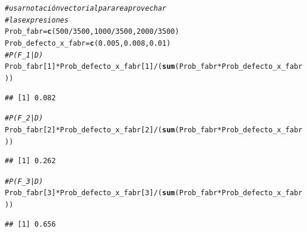 \documentclass[10pt,a4paper]{article}\usepackage[]{graphicx}\usepackage[]{color}
\makeatletter
\newcommand{\hlnum}[1]{\textcolor[rgb]{0.686,0.059,0.569}{#1}}%
\newcommand{\hlcom}[1]{\textcolor[rgb]{0.678,0.584,0.686}{\textit{#1}}}%
\newcommand{\hlopt}[1]{\textcolor[rgb]{0,0,0}{#1}}%
\newcommand{\hlstd}[1]{\textcolor[rgb]{0.345,0.345,0.345}{#1}}%
\newcommand{\hlkwb}[1]{\textcolor[rgb]{0.69,0.353,0.396}{#1}}%
\newcommand{\hlkwd}[1]{\textcolor[rgb]{0.737,0.353,0.396}{\textbf{#1}}}%
\newenvironment{kframe}{%
 \def\at@end@of@kframe{}%
 \ifinner\ifhmode%
  \def\at@end@of@kframe{\end{minipage}}%
  \begin{minipage}{\columnwidth}%
 \fi\fi%
 \def\FrameCommand##1{\hskip\@totalleftmargin \hskip-\fboxsep
 \colorbox{shadecolor}{##1}\hskip-\fboxsep
     \hskip-\linewidth \hskip-\@totalleftmargin \hskip\columnwidth}%
 \MakeFramed {\advance\hsize-\width
   \@totalleftmargin\z@ \linewidth\hsize
   \@setminipage}}%
 {\par\unskip\endMakeFramed%
 \at@end@of@kframe}
\newenvironment{knitrout}{}{} %
\makeatother
\begin{document}
\begin{knitrout}
\color{fgcolor}\begin{kframe}
\begin{alltt}
\hlcom{# usar notación vectorial para reaprovechar }
\hlcom{# las expresiones}
\hlstd{Prob_fabr} \hlkwb{=} \hlkwd{c}\hlstd{(}\hlnum{500}\hlopt{/}\hlnum{3500}\hlstd{,}\hlnum{1000}\hlopt{/}\hlnum{3500}\hlstd{,} \hlnum{2000}\hlopt{/}\hlnum{3500}\hlstd{)}
\hlstd{Prob_defecto_x_fabr} \hlkwb{=} \hlkwd{c}\hlstd{(}\hlnum{0.005}\hlstd{,}\hlnum{0.008}\hlstd{,} \hlnum{0.01}\hlstd{)}
\hlcom{# P(F_1|D)}
\hlstd{Prob_fabr[}\hlnum{1}\hlstd{]}\hlopt{*}\hlstd{Prob_defecto_x_fabr[}\hlnum{1}\hlstd{]}\hlopt{/}\hlstd{(}\hlkwd{sum}\hlstd{(Prob_fabr}\hlopt{*}\hlstd{Prob_defecto_x_fabr))}
\end{alltt}
\begin{verbatim}
## [1] 0.082
\end{verbatim}
\begin{alltt}
\hlcom{# P(F_2|D)}
\hlstd{Prob_fabr[}\hlnum{2}\hlstd{]}\hlopt{*}\hlstd{Prob_defecto_x_fabr[}\hlnum{2}\hlstd{]}\hlopt{/}\hlstd{(}\hlkwd{sum}\hlstd{(Prob_fabr}\hlopt{*}\hlstd{Prob_defecto_x_fabr))}
\end{alltt}
\begin{verbatim}
## [1] 0.262
\end{verbatim}
\begin{alltt}
\hlcom{# P(F_3|D) }
\hlstd{Prob_fabr[}\hlnum{3}\hlstd{]}\hlopt{*}\hlstd{Prob_defecto_x_fabr[}\hlnum{3}\hlstd{]}\hlopt{/}\hlstd{(}\hlkwd{sum}\hlstd{(Prob_fabr}\hlopt{*}\hlstd{Prob_defecto_x_fabr))}
\end{alltt}
\begin{verbatim}
## [1] 0.656
\end{verbatim}
\end{kframe}
\end{knitrout}
\end{document}
